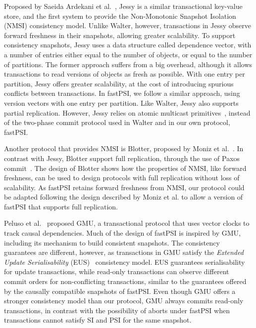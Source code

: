 Proposed by Saeida Ardekani et al.~\citep{ardekani_nmsi}, Jessy is a similar transactional key-value store, and the first system to provide the Non-Monotonic Snapshot Isolation (NMSI) consistency model. Unlike Walter, however, transactions in Jessy observe forward freshness in their snapshots, allowing greater scalability. To support consistency snapshots, Jessy uses a data structure called dependence vector, with a number of entries either equal to the number of objects, or equal to the number of partitions. The former approach suffers from a big overhead, although it allows transactions to read versions of objects as fresh as possible. With one entry per partition, Jessy offers greater scalability, at the cost of introducing spurious conflicts between transactions. In fastPSI, we follow a similar approach, using version vectors with one entry per partition. Like Walter, Jessy also supports partial replication. However, Jessy relies on atomic multicast primitives~\citep{guerraoui_multicast}, instead of the two-phase commit protocol used in Walter and in our own protocol, fastPSI.

Another protocol that provides NMSI is Blotter, proposed by Moniz et al.~\citep{moniz_blotter}. In contrast with Jessy, Blotter support full replication, through the use of Paxos commit~\citep{gray_paxos_commit}. The design of Blotter shows how the properties of NMSI, like forward freshness, can be used to design protocols with full replication without loss of scalability. As fastPSI retains forward freshness from NMSI, our protocol could be adapted following the design described by Moniz et al. to allow a version of fastPSI that supports full replication.

Peluso et al.~\citep{peluso_gmu} proposed GMU, a transactional protocol that uses vector clocks to track causal dependencies. Much of the design of fastPSI is inspired by GMU, including its mechanism to build consistent snapshots. The consistency guarantees are different, however, as transactions in GMU satisfy the \emph{Extended Update Serialisability} (EUS)~\citep{hansdah_update_ser, adya_thesis} consistency model. EUS guarantees serialisability for update transactions, while read-only transactions can observe different commit orders for non-conflicting transactions, similar to the guarantees offered by the causally compatible snapshots of fastPSI. Even though GMU offers a stronger consistency model than our protocol, GMU always commits read-only transactions, in contrast with the possibility of aborts under fastPSI when transactions cannot satisfy SI and PSI for the same snapshot.

